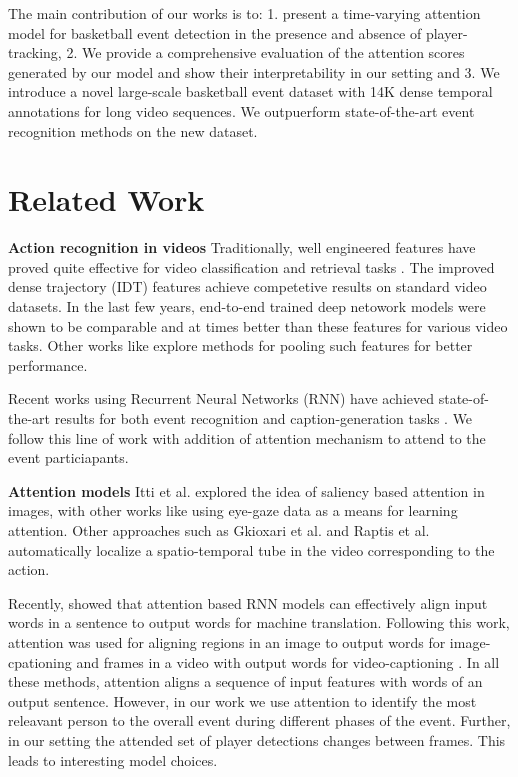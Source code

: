 \documentclass[10pt,twocolumn,letterpaper]{article}
\begin{document}
The main contribution of our works is to:
1. present a time-varying attention model for basketball event detection
in the presence and absence of player-tracking, 2. We provide a comprehensive
evaluation of the attention scores generated by our model and show
their interpretability in our setting and 3. We introduce a novel
large-scale basketball event dataset with 14K dense temporal annotations
for long video sequences. We outpuerform state-of-the-art
event recognition methods on the new dataset.


\section{Related Work}

\noindent \textbf{Action recognition in videos}
Traditionally, well engineered features have proved quite effective for video
classification and retrieval tasks
\cite{Dalal_ECCV06,Jain_CVPR13,Jiang_ECCV12,Laptev_CVPR08,
Niebels_ECCV10,Oh_MVA14,Oneata_ICCV13,Peng_ECCV14,Sadanand_CVPR12,Wang_BMVC09,Wang_CVPR11}.
The improved dense trajectory (IDT) features \cite{Wang_CVPR11} achieve
competetive results on standard video datasets.  In the last few years,
end-to-end trained deep netowork models
\cite{Ji_PAMI13,Karpathy_CVPR14,Simonyan_2014,Tran_arxiv14} were shown to be comparable and
at times better than these features for various video tasks.  Other works like
\cite{Xu_2015,Zha_2015,Wang_arxiv15} explore methods for pooling such
features for better performance.

Recent works using Recurrent Neural Networks (RNN) have achieved
state-of-the-art results for both event recognition and caption-generation
tasks \cite{Donahue_arxiv14,Ng_arxiv15,Srivastava_2015,Yao_arxiv15}.
We follow this line of work with addition of attention mechanism
to attend to the event particiapants.

\noindent \textbf{Attention models}
Itti et al. \cite{Itti_PAMI98} explored the idea of saliency based attention in
images, with other works like \cite{Shapovalova_NIPS13} using eye-gaze data as
a means for learning attention.
Other approaches such as Gkioxari et al. \cite{Gkioxari_arxiv14} and Raptis et al. \cite{Raptis_CVPR12}
automatically localize a spatio-temporal tube in the video corresponding to the action.

Recently, \cite{Bahdnau_arxiv14} showed that
attention based RNN models can effectively align input words in a sentence to
output words for machine translation.  Following this work, attention was used
for aligning regions in an image to output words for image-cpationing
\cite{Xu_arxiv15} and frames in a video with output words for video-captioning
\cite{Yao_arxiv15}.  In all these methods, attention aligns a sequence of input
features with words of an output sentence. However, in our work we use
attention to identify the most releavant person to the overall event during
different phases of the event.  Further, in our setting the attended set of
player detections changes between frames. This leads to interesting model choices.
\end{document}

